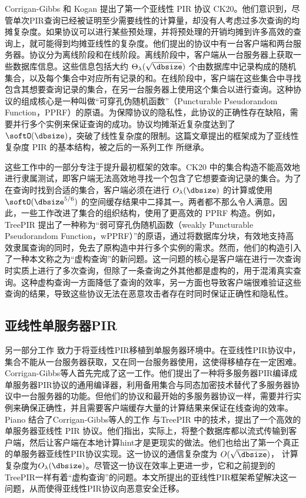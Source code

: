 Corrigan-Gibbs 和 Kogan 提出了第一个亚线性 PIR 协议 CK20\cite{CK20}。他们意识到，尽管单次PIR查询已经被证明至少需要线性的计算量，却没有人考虑过多次查询的均摊复杂度。如果协议可以进行某些预处理，并将预处理的开销均摊到许多高效的查询上，就可能得到均摊亚线性的复杂度。他们提出的协议中有一台客户端和两台服务器。协议分为离线阶段和在线阶段。离线阶段中，客户端从一台服务器上获取一些数据库信息。这些信息包括大约 $\Theta_\lambda(\sqrt{\dbsize})$ 个由数据库中记录构成的随机集合，以及每个集合中对应所有记录的和。在线阶段中，客户端在这些集合中寻找包含其想要查询记录的集合，在另一台服务器上使用这个集合以进行查询。这种协议的组成核心是一种叫做“可穿孔伪随机函数”（Puncturable Pseudorandom Function，PPRF）的原语。为保障协议的隐私性，此协议的正确性存在缺陷，需要并行多个实例来保证查询的成功。协议均摊渐近复杂度达到了 $\softO(\dbsize)$，突破了线性复杂度的限制。这篇文章提出的框架成为了亚线性复杂度 PIR 的基本结构，被之后的一系列工作 \cite{Piano,MIR23,CHK22,Checklist,TreePIR} 所继承。

这些工作中的一部分专注于提升最初框架的效率。CK20\cite{CK20} 中的集合构造不能高效地进行隶属测试，即客户端无法高效地寻找一个包含了它想要查询记录的集合。为了在查询时找到合适的集合，客户端必须在进行 $O_\lambda(\dbsize)$ 的计算或使用 $\softO(\dbsize^{5/6})$ 的空间缓存结果中二择其一。两者都不那么令人满意。因此，一些工作\cite{TreePIR,C:SACM21}改进了集合的组织结构，使用了更高效的 PPRF 构造。例如，TreePIR\cite{TreePIR} 提出了一种称为“弱可穿孔伪随机函数（weakly Puncturable Pseudorandom Function，wPPRF）”的原语，通过将数据库分块，有效地支持高效隶属查询的同时，免去了原构造中并行多个实例的需求。然而，他们的构造引入了一种本文称之为“虚构查询”的新问题。这一问题的核心是客户端在进行一次查询时实质上进行了多次查询，但除了一条查询之外其他都是虚构的，用于混淆真实查询。这种虚构查询一方面降低了查询的效率，另一方面也导致客户端很难验证这些查询的结果，导致这些协议无法在恶意攻击者存在时同时保证正确性和隐私性。

\subsection{亚线性单服务器PIR}
另一部分工作 \cite{Piano,CHK22} 致力于将亚线性PIR移植到单服务器环境中。在亚线性PIR协议中，集合不能从一台服务器获取，又在同一台服务器使用，这使得移植存在一定困难。Corrigan-Gibbs等人首先完成了这一工作\cite{CHK22}。他们提出了一种将多服务器PIR编译成单服务器PIR协议的通用编译器，利用备用集合与同态加密技术替代了多服务器协议中一台服务器的功能。但他们的协议和最开始的多服务器协议一样，需要并行实例来确保正确性，并且需要客户端缓存大量的计算结果来保证在线查询的效率。Piano \cite{Piano} 结合了Corrigan-Gibbs等人的工作\cite{CHK22} 与TreePIR \cite{TreePIR} 中的技术，提出了一个高效的单服务器亚线性 PIR 协议。他们指出，实际上，将整个数据库都以流式传输到客户端，然后让客户端在本地计算hint才是更现实的做法。他们也给出了第一个真正的单服务器亚线性PIR协议实现。这一协议的通信复杂度为 $O(\sqrt{\dbsize})$， 计算复杂度为$O_\lambda(\dbsize)$。尽管这一协议在效率上更进一步，它和之前提到的TreePIR一样有着“虚构查询”的问题。本文所提出的亚线性PIR框架希望解决这一问题，从而使得亚线性PIR协议向恶意安全迁移。

